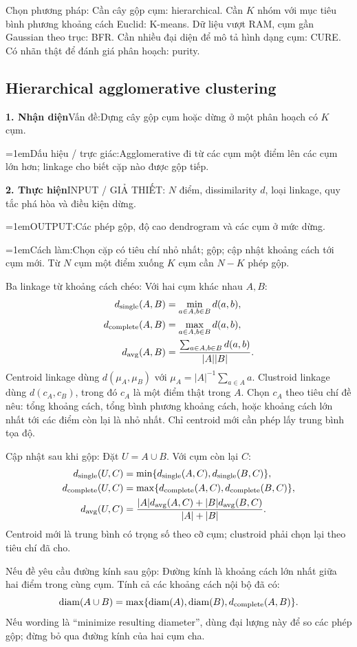\documentclass[10pt,a4paper,twocolumn]{article}
\newif\ifexamheadingprinted
\newcommand{\topic}[2]{%
  \global\examheadingprintedfalse\par\subsection{#2}\label{topic:#1}}
\newcommand{\key}[1]{#1:\enspace}
\newcommand{\algfield}[2]{\par\noindent\hangindent=1em\relax#1:\enspace#2}
\newcommand{\unitfield}[4]{%
  \par\noindent\textbf{#1. #2}\enspace #3:\enspace #4}
\newcommand{\algsummary}[6]{%
  \begingroup\setlength{\parskip}{1pt}%
  \unitfield{1}{Nhận diện}{Vấn đề}{#1}%
  \algfield{Dấu hiệu / trực giác}{#2}%
  \if\relax\detokenize{#3}\relax\else\par\noindent#3\par\fi%
  \unitfield{2}{Thực hiện}{INPUT / GIẢ THIẾT}{#4}%
  \algfield{OUTPUT}{#5}%
  \algfield{Cách làm}{#6}\par\endgroup}
\begin{document}
\key{Chọn phương pháp} Cần cây gộp cụm: hierarchical. Cần $K$ nhóm với mục tiêu bình phương khoảng cách Euclid: K-means. Dữ liệu vượt RAM, cụm gần Gaussian theo trục: BFR. Cần nhiều đại diện để mô tả hình dạng cụm: CURE. Có nhãn thật để đánh giá phân hoạch: purity.

\topic{hierarchical}{Hierarchical agglomerative clustering}

\algsummary{Dựng cây gộp cụm hoặc dừng ở một phân hoạch có $K$ cụm.}{Agglomerative đi từ các cụm một điểm lên các cụm lớn hơn; linkage cho biết cặp nào được gộp tiếp.}{}{ $N$ điểm, dissimilarity $d$, loại linkage, quy tắc phá hòa và điều kiện dừng.}{Các phép gộp, độ cao dendrogram và các cụm ở mức dừng.}{Chọn cặp có tiêu chí nhỏ nhất; gộp; cập nhật khoảng cách tới cụm mới. Từ $N$ cụm một điểm xuống $K$ cụm cần $N-K$ phép gộp.}

\key{Ba linkage từ khoảng cách chéo} Với hai cụm khác nhau $A,B$:
\begin{align*}
d_{\rm single}(A,B)&=\min_{a\in A,b\in B}d(a,b),\\
d_{\rm complete}(A,B)&=\max_{a\in A,b\in B}d(a,b),\\
d_{\rm avg}(A,B)&=\frac{\sum_{a\in A,b\in B}d(a,b)}{|A||B|}.
\end{align*}
Centroid linkage dùng $d(\mu_A,\mu_B)$ với $\mu_A=|A|^{-1}\sum_{a\in A}a$. Clustroid linkage dùng $d(c_A,c_B)$, trong đó $c_A$ là một điểm thật trong $A$. Chọn $c_A$ theo tiêu chí đề nêu: tổng khoảng cách, tổng bình phương khoảng cách, hoặc khoảng cách lớn nhất tới các điểm còn lại là nhỏ nhất. Chỉ centroid mới cần phép lấy trung bình tọa độ.

\key{Cập nhật sau khi gộp} Đặt $U=A\cup B$. Với cụm còn lại $C$:
\begin{align*}
d_{\rm single}(U,C)&=\min\{d_{\rm single}(A,C),d_{\rm single}(B,C)\},\\
d_{\rm complete}(U,C)&=\max\{d_{\rm complete}(A,C),d_{\rm complete}(B,C)\},\\
d_{\rm avg}(U,C)&=\frac{|A|d_{\rm avg}(A,C)+|B|d_{\rm avg}(B,C)}{|A|+|B|}.
\end{align*}
Centroid mới là trung bình có trọng số theo cỡ cụm; clustroid phải chọn lại theo tiêu chí đã cho.

\key{Nếu đề yêu cầu đường kính sau gộp} Đường kính là khoảng cách lớn nhất giữa hai điểm trong cùng cụm. Tính cả các khoảng cách nội bộ đã có:
\[
\operatorname{diam}(A\cup B)=\max\{\operatorname{diam}(A),\operatorname{diam}(B),d_{\rm complete}(A,B)\}.
\]
Nếu wording là ``minimize resulting diameter'', dùng đại lượng này để so các phép gộp; đừng bỏ qua đường kính của hai cụm cha.
\end{document}
